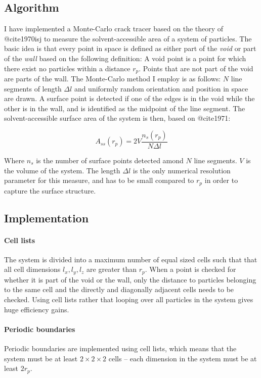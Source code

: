 \subsection{Algorithm}
I have implemented a Monte-Carlo crack tracer based on the theory of @cite1970isj to measure the solvent-accessible area of a system of particles. The basic idea is that every point in space is defined as either part of the \emph{void} or part of the \emph{wall} based on the following definition: A void point is a point for which there exist no particles within a distance $r_p$. Points that are not part of the void are parts of the wall. The Monte-Carlo method I employ is as follows: $N$ line segments of length $\Delta l$ and uniformly random orientation and position in space are drawn. A surface point is detected if one of the edges is in the void while the other is in the wall, and is identified as the midpoint of the line segment. The solvent-accessible surface area of the system is then, based on @cite1971:

\begin{equation}
A_{ss}(r_p) = 2V\frac{n_s(r_p)}{N\Delta l}
\end{equation}

Where $n_s$ is the number of surface points detected amond $N$ line segments. $V$ is the volume of the system. The length $\Delta l$ is the only numerical resolution parameter for this measure, and has to be small compared to $r_p$ in order to capture the surface structure. 

\subsection{Implementation}
\paragraph{Cell lists}
The system is divided into a maximum number of equal sized cells such that that all cell dimensions $l_x, l_y, l_z$ are greater than $r_p$. When a point is checked for whether it is part of the void or the wall, only the distance to particles belonging to the same cell and the directly and diagonally adjacent cells needs to be checked. Using cell lists rather that looping over all particles in the system gives huge efficiency gains.
\paragraph{Periodic boundaries}
Periodic boundaries are implemented using cell lists, which means that the system must be at least $2\times 2 \times 2$ cells – each dimension in the system must be at least $2r_p$.
